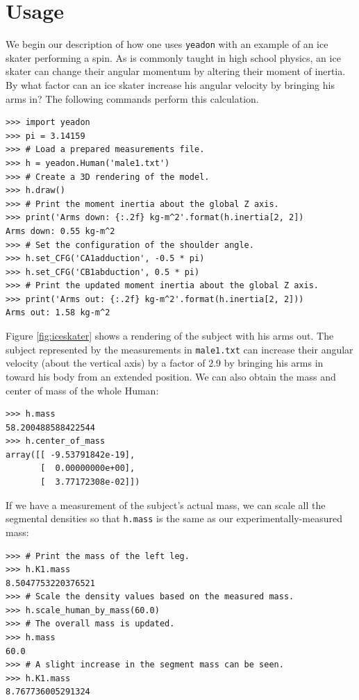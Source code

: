 \documentclass[10pt]{article}
\begin{document}
\section*{Usage}
\label{sec:usage}

We begin our description of how one uses \verb+yeadon+ with an example of an
ice skater performing a spin. As is commonly taught in high school physics, an
ice skater can change their angular momentum by altering their moment of
inertia. By what factor can an ice skater increase his angular velocity
by bringing his arms in? The following commands perform this calculation.

\begin{verbatim}
>>> import yeadon
>>> pi = 3.14159
>>> # Load a prepared measurements file.
>>> h = yeadon.Human('male1.txt')
>>> # Create a 3D rendering of the model.
>>> h.draw()
>>> # Print the moment inertia about the global Z axis.
>>> print('Arms down: {:.2f} kg-m^2'.format(h.inertia[2, 2])
Arms down: 0.55 kg-m^2
>>> # Set the configuration of the shoulder angle.
>>> h.set_CFG('CA1adduction', -0.5 * pi)
>>> h.set_CFG('CB1abduction', 0.5 * pi)
>>> # Print the updated moment inertia about the global Z axis.
>>> print('Arms out: {:.2f} kg-m^2'.format(h.inertia[2, 2]))
Arms out: 1.58 kg-m^2
\end{verbatim}

Figure \ref{fig:iceskater} shows a rendering of the subject with his arms out.
The subject represented by the measurements in \verb+male1.txt+ can increase
their angular velocity (about the vertical axis) by a factor of 2.9 by bringing
his arms in toward his body from an extended position. We can also obtain the
mass and center of mass of the whole Human:

\begin{verbatim}
>>> h.mass
58.200488588422544
>>> h.center_of_mass
array([[ -9.53791842e-19],
       [  0.00000000e+00],
       [  3.77172308e-02]])
\end{verbatim}

If we have a measurement of the subject's actual mass, we can scale all the
segmental densities so that \verb+h.mass+ is the same as our
experimentally-measured mass:

\begin{verbatim}
>>> # Print the mass of the left leg.
>>> h.K1.mass
8.5047753220376521
>>> # Scale the density values based on the measured mass.
>>> h.scale_human_by_mass(60.0)
>>> # The overall mass is updated.
>>> h.mass
60.0
>>> # A slight increase in the segment mass can be seen.
>>> h.K1.mass
8.767736005291324
\end{verbatim}
\end{document}
